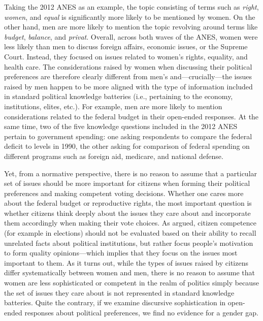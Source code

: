 Taking the 2012 ANES as an example, the topic consisting of terms such as \textit{right}, \textit{women}, and \textit{equal} is significantly more likely to be mentioned by women. On the other hand, men are more likely to mention the topic revolving around terms like \textit{budget}, \textit{balance}, and \textit{privat}. Overall, across both waves of the ANES, women were less likely than men to discuss foreign affairs, economic issues, or the Supreme Court. Instead, they focused on issues related to women's rights, equality, and health care. The considerations raised by women when discussing their political preferences are therefore clearly different from men's and---crucially---the issues raised by men happen to be more aligned with the type of information included in standard political knowledge batteries (i.e., pertaining to the economy, institutions, elites, etc.). For example, men are more likely to mention considerations related to the federal budget in their open-ended responses. At the same time, two of the five knowledge questions included in the 2012 ANES pertain to government spending: one asking respondents to compare the federal deficit to levels in 1990, the other asking for comparison of federal spending on different programs such as foreign aid, medicare, and national defense.

Yet, from a normative perspective, there is no reason to assume that a particular set of issues should be more important for citizens when forming their political preferences and making competent voting decisions. Whether one cares more about the federal budget or reproductive rights, the most important question is whether citizens think deeply about the issues they care about and incorporate them accordingly when making their vote choices. As \citet{druckman2014pathologies} argued, citizen competence (for example in elections) should not be evaluated based on their ability to recall unrelated facts about political institutions, but rather focus people's motivation to form quality opinions---which implies that they focus on the issues most important to them. As it turns out, while the types of issues raised by citizens differ systematically between women and men, there is no reason to assume that women are less sophisticated or competent in the realm of politics simply because the set of issues they care about is not represented in standard knowledge batteries. Quite the contrary, if we examine discursive sophistication in open-ended responses about political preferences, we find no evidence for a gender gap.


